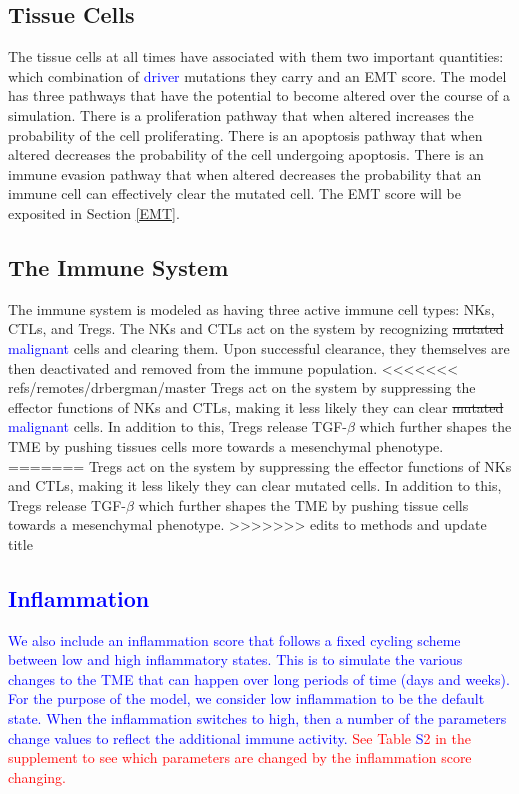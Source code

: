 \documentclass[11pt]{article}
\newcommand{\tcr} { \textcolor{red} }
\newcommand{\tcb} { \textcolor{blue} }
\begin{document}
\subsection{Tissue Cells}\label{TissueCells}
The tissue cells at all times have associated with them two important quantities: which combination of \tcb{driver} mutations they carry and an EMT score.
The model has three pathways that have the potential to become altered over the course of a simulation.
There is a proliferation pathway that when altered increases the probability of the cell proliferating.
There is an apoptosis pathway that when altered decreases the probability of the cell undergoing apoptosis.
There is an immune evasion pathway that when altered decreases the probability that an immune cell can effectively clear the mutated cell.
The EMT score will be exposited in Section \ref{EMT}. 

\subsection{The Immune System}\label{ImmuneSystem}
The immune system is modeled as having three active immune cell types: NKs, CTLs, and Tregs.
The NKs and CTLs act on the system by recognizing \sout{mutated} \tcb{malignant} cells and clearing them.
Upon successful clearance, they themselves are then deactivated and removed from the immune population.
<<<<<<< refs/remotes/drbergman/master
Tregs act on the system by suppressing the effector functions of NKs and CTLs, making it less likely they can clear \sout{mutated} \tcb{malignant} cells.
In addition to this, Tregs release TGF-$\beta$ which further shapes the TME by pushing tissues cells more towards a mesenchymal phenotype.
=======
Tregs act on the system by suppressing the effector functions of NKs and CTLs, making it less likely they can clear mutated cells.
In addition to this, Tregs release TGF-$\beta$ which further shapes the TME by pushing tissue cells towards a mesenchymal phenotype.
>>>>>>> edits to methods and update title

\tcb{
\subsection{Inflammation} 
We also include an inflammation score that follows a fixed cycling scheme between low and high inflammatory states.
This is to simulate the various changes to the TME that can happen over long periods of time (days and weeks).
For the purpose of the model, we consider low inflammation to be the default state.
When the inflammation switches to high, then a number of the parameters change values to reflect the additional immune activity.
\tcr{See Table \tcb{S}2 in the supplement to see which parameters are changed by the inflammation score changing.}
}
\end{document}
